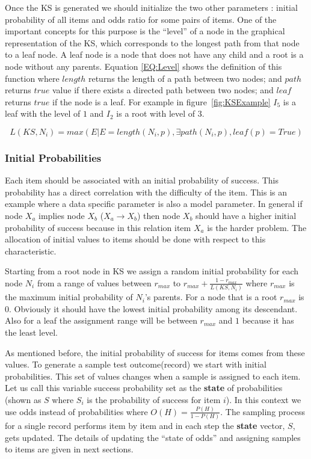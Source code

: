 Once the KS is generated we should initialize the two other parameters : initial probability of all items and odds ratio for some pairs of items. One of the important concepts for this purpose is the ``level'' of a node in the graphical representation of the KS, which corresponds to the longest path from that node to a leaf node. A leaf node is a node that does not have any child and a root is a node without any parents. Equation \ref{EQ:Level} shows the definition of this function where $length$ returns the length of a path between two nodes; and $path$ returns $true$ value if there exists a directed path between two nodes; and $leaf$ returns $true$ if the node is a leaf. For example in figure~\ref{fig:KSExample} $I_{5}$ is a leaf with the level of $1$ and $I_{2}$ is a root with level of $3$.

\begin{equation}
L(KS,N_{i}) = max(E|E=length(N_{i},p)  ,  \exists path(N_{i},p)  , leaf(p)=True)
\label{EQ:Level}
\end{equation}

\subsubsection{Initial Probabilities}

Each item should be associated with an initial probability of success. This probability has a direct correlation with the difficulty of the item. This is an example where a data specific parameter is also a model parameter. In general if node $X_a$ implies node $X_b$ ($X_a \rightarrow X_b$) then node $X_b$ should have a higher initial probability of success because in this relation item $X_a$ is the harder problem. The allocation of initial values to items should be done with respect to this characteristic. 

Starting from a root node in KS we assign a random initial probability for each node $N_{i}$ from a range of values between $r_{max}$ to $r_{max}+\frac{1-r_{max}}{L(KS,N_{i})}$ where $r_{max}$ is the maximum initial probability of $N_{i}$'s parents. For a node that is a root $r_{max}$ is $0$. Obviously it should have the lowest initial probability among its descendant. Also for a leaf the assignment range will be between $r_{max}$ and $1$ because it has the least level. 


As mentioned before, the initial probability of success for items comes from these values. To generate a sample test outcome(record) we start with initial probabilities. This set of values changes when a sample is assigned to each item. Let us call this variable success probability set as the \textbf{state} of probabilities (shown as $S$ where $S_i$ is the probability of success for item $i$). In this context we use odds instead of probabilities where $O(H) = \frac{P(H)}{1-P(H)}$. The sampling process for a single record performs item by item and in each step the \textbf{state} vector, $S$, gets updated. The details of updating the ``state of odds'' and assigning samples to items are given in next sections.

